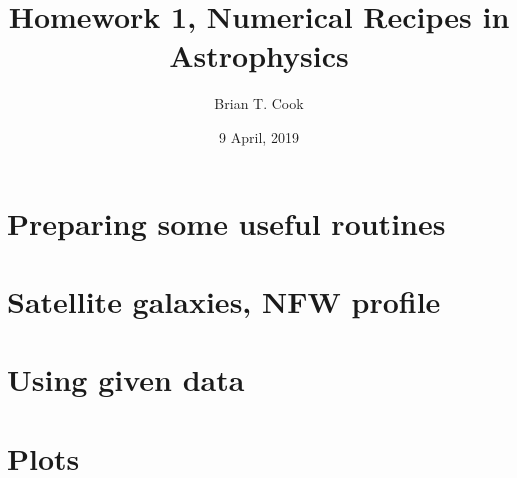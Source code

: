 \documentclass[10pt]{article}
\title{Homework 1, Numerical Recipes in Astrophysics}
\author{Brian T. Cook}
\date{9 April, 2019}
\begin{document}
\maketitle

\section{Preparing some useful routines}





\section{Satellite galaxies, NFW profile}

















\section{Using given data}





\section{Plots}


\end{document}
